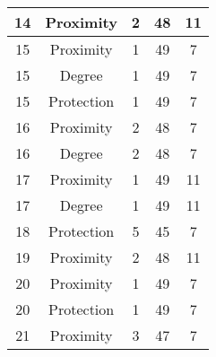 \documentclass[results.tex]{subfiles}
\begin{document}
\begin{center}
\begin{tabular}{| c || c | c | c | c |}
            \hline
            14                      & Proximity                    & 2                      & 48                      & 11                   \\
            \hline
            15                      & Proximity                    & 1                      & 49                      & 7                    \\
            \hline
            15                      & Degree                       & 1                      & 49                      & 7                    \\
            \hline
            15                      & Protection                   & 1                      & 49                      & 7                    \\
            \hline
            16                      & Proximity                    & 2                      & 48                      & 7                    \\
            \hline
            16                      & Degree                       & 2                      & 48                      & 7                    \\
            \hline
            17                      & Proximity                    & 1                      & 49                      & 11                   \\
            \hline
            17                      & Degree                       & 1                      & 49                      & 11                   \\
            \hline
            18                      & Protection                   & 5                      & 45                      & 7                    \\
            \hline
            19                      & Proximity                    & 2                      & 48                      & 11                   \\
            \hline
            20                      & Proximity                    & 1                      & 49                      & 7                    \\
            \hline
            20                      & Protection                   & 1                      & 49                      & 7                    \\
            \hline
            21                      & Proximity                    & 3                      & 47                      & 7                    \\

\end{tabular}
\end{center}
\end{document}
